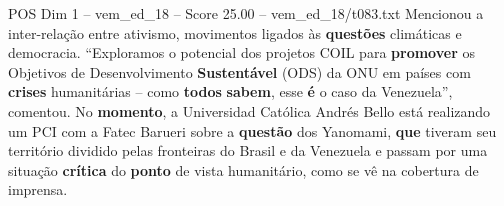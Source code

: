 \begin{textsample}{POS Dim 1 – vem\_ed\_18 – Score 25.00 – vem\_ed\_18/t083.txt}
Mencionou a inter-relação entre ativismo, movimentos ligados às \textbf{questões} climáticas e democracia. “Exploramos o potencial dos projetos COIL para \textbf{promover} os Objetivos de Desenvolvimento \textbf{Sustentável} (ODS) da ONU em países com \textbf{crises} humanitárias – como \textbf{todos} \textbf{sabem}, esse \textbf{é} o caso da Venezuela”, comentou.
No \textbf{momento}, a Universidad Católica Andrés Bello está realizando um PCI com a Fatec Barueri sobre a \textbf{questão} dos Yanomami, \textbf{que} tiveram seu território dividido pelas fronteiras do Brasil e da Venezuela e passam por uma situação \textbf{crítica} do \textbf{ponto} de vista humanitário, como se vê na cobertura de imprensa.

\end{textsample}

